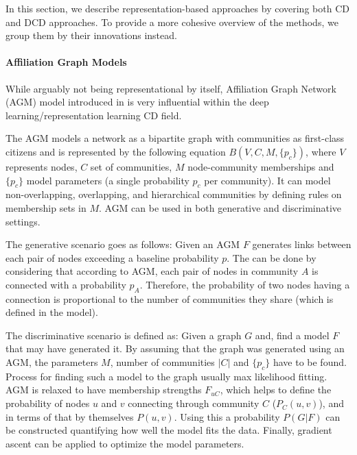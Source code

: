 \documentclass[
acmsmall,
nonacm,
screen,
acmthm]{../../scripts/pandoc/templates/acmart}
\begin{document}
In this section, we describe representation-based approaches by covering
both CD and DCD approaches. To provide a more cohesive overview of the
methods, we group them by their innovations instead.

\hypertarget{affiliation-graph-models}{%
\paragraph{Affiliation Graph Models}\label{affiliation-graph-models}}

While arguably not being representational by itself, Affiliation Graph
Network (AGM) model introduced in
\citet{yangCommunityAffiliationGraphModel2012} is very influential
within the deep learning/representation learning CD field.

The AGM models a network as a bipartite graph with communities as
first-class citizens and is represented by the following equation
\(B(V, C, M, \{p_c\})\), where \(V\) represents nodes, \(C\) set of
communities, \(M\) node-community memberships and \(\{p_c\}\) model
parameters (a single probability \(p_c\) per community). It can model
non-overlapping, overlapping, and hierarchical communities by defining
rules on membership sets in \(M\). AGM can be used in both generative
and discriminative settings.

The generative scenario goes as follows: Given an AGM \(F\) generates
links between each pair of nodes exceeding a baseline probability \(p\).
The can be done by considering that according to AGM, each pair of nodes
in community \(A\) is connected with a probability \(p_A\). Therefore,
the probability of two nodes having a connection is proportional to the
number of communities they share (which is defined in the model).

The discriminative scenario is defined as: Given a graph \(G\) and, find
a model \(F\) that may have generated it. By assuming that the graph was
generated using an AGM, the parameters \(M\), number of communities
\(|C|\) and \(\{p_c\}\) have to be found. Process for finding such a
model to the graph usually max likelihood fitting. AGM is relaxed to
have membership strengths \(F_{uC}\), which helps to define the
probability of nodes \(u\) and \(v\) connecting through community \(C\)
(\(P_{C}(u, v)\)), and in terms of that by themselves \(P(u, v)\). Using
this a probability \(P(G|F)\) can be constructed quantifying how well
the model fits the data. Finally, gradient ascent can be applied to
optimize the model parameters.
\end{document}
